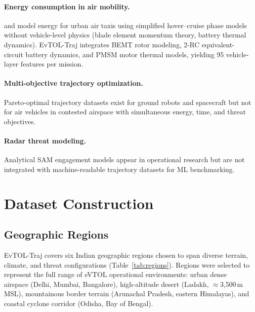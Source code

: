 \documentclass{article}
\begin{document}
\paragraph{Energy consumption in air mobility.}
\citet{rodrigues2021energy} and \citet{nakamura2023energy} model energy
for urban air taxis using simplified hover--cruise phase models without
vehicle-level physics (blade element momentum theory, battery thermal dynamics).
EvTOL-Traj integrates BEMT rotor modeling, 2-RC equivalent-circuit
battery dynamics, and PMSM motor thermal models, yielding 95 vehicle-layer
features per mission.

\paragraph{Multi-objective trajectory optimization.}
Pareto-optimal trajectory datasets exist for ground robots
\citep{gammell2015batch} and spacecraft \citep{raghavendra2021asteroid}
but not for air vehicles in contested airspace with simultaneous energy,
time, and threat objectives.

\paragraph{Radar threat modeling.}
Analytical SAM engagement models appear in operational research
\citep{bodner1994radar,skolnik2008radar} but are not integrated with
machine-readable trajectory datasets for ML benchmarking.

\section{Dataset Construction}
\label{sec:construction}

\subsection{Geographic Regions}
\label{sec:regions}

EvTOL-Traj covers six Indian geographic regions chosen to span diverse
terrain, climate, and threat configurations (Table~\ref{tab:regions}).
Regions were selected to represent the full range of eVTOL operational
environments: urban dense airspace (Delhi, Mumbai, Bangalore), high-altitude
desert (Ladakh, $\approx$3{,}500\,m MSL), mountainous border terrain
(Arunachal Pradesh, eastern Himalayas), and coastal cyclone corridor
(Odisha, Bay of Bengal).
\end{document}
